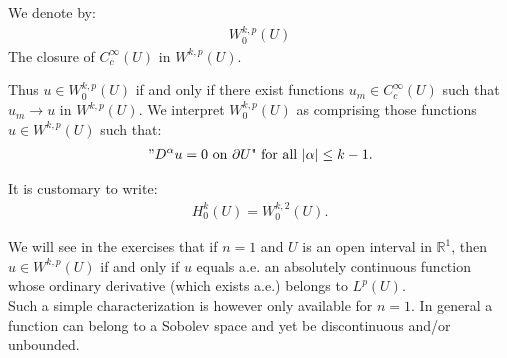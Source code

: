 \begin{definition}{}
  We denote by:
  \begin{align*}
    W^{k,p}_0(U)
  \end{align*}
  The closure of $C^{\infty}_{c}(U)$ in $W^{k,p}(U)$. 
\end{definition}
Thus $u\in W^{k,p}_0(U)$ if and only if there exist functions $u_m\in C^{\infty}_{c}(U)$ such that $u_m\to u$ in $W^{k,p}(U)$. We interpret $W^{k,p}_{0}(U)$ as comprising those functions $u\in W^{k,p}(U)$ such that:
\begin{align*}
  "D^{\alpha}u=0\text{ on $\partial U$" for all $|\alpha|\leq k-1$.}
\end{align*}
\begin{note}{}
  It is customary to write:
  \begin{align*}
    H^{k}_{0}(U)=W^{k,2}_{0}(U).
  \end{align*}
\end{note}
We will see in the exercises that if $n=1$ and $U$ is an open interval in $\mathbb{R}^{1}$, then $u\in W^{k,p}(U)$ if and only if $u$ equals a.e. an absolutely continuous function whose ordinary derivative (which exists a.e.) belongs to $L^{p}(U)$.\\
Such a simple characterization is however only available for $n=1$. In general a function can belong to a Sobolev space and yet be discontinuous and/or unbounded.
